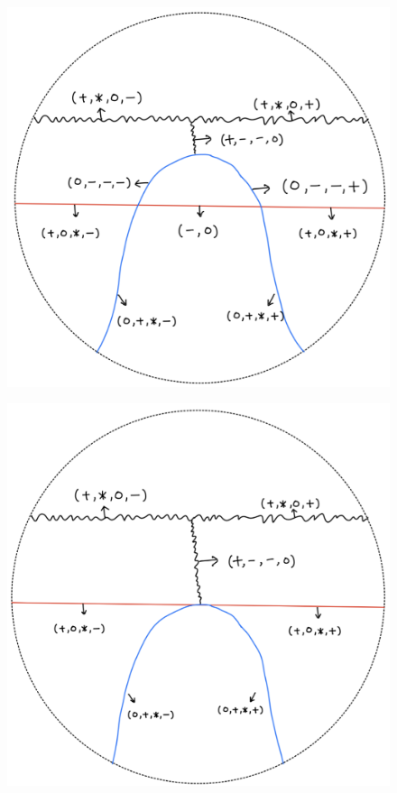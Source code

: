 \begin{definition}
\begin{enumerate}
\begin{itemize}
\begin{figure}[H]
    \caption{}
    \label{fig:your-label}
\end{figure}
\begin{figure}[H]
    \centering
    \includegraphics[scale = 0.45]{diagrams/lemma2/14.png} 
    \caption{}
    \label{fig:your-label}
\end{figure}
\begin{figure}[H]
    \centering
    \includegraphics[scale = 0.45]{diagrams/lemma2/15.png} 

\end{figure}
\end{itemize}
\end{enumerate}
\end{definition}
